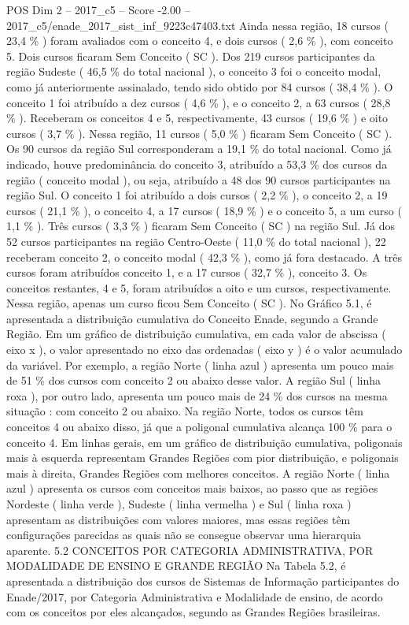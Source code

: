 \begin{textsample}{POS Dim 2 – 2017\_c5 – Score -2.00 – 2017\_c5/enade\_2017\_sist\_inf\_9223c47403.txt}
Ainda nessa região, 18 cursos ( 23,4 \% ) foram avaliados com o conceito 4, e dois cursos ( 2,6 \% ), com conceito 5.
Dois cursos ficaram Sem Conceito ( SC ).
Dos 219 cursos participantes da região Sudeste ( 46,5 \% do total nacional ), o conceito 3 foi o conceito modal, como já anteriormente assinalado, tendo sido obtido por 84 cursos ( 38,4 \% ).
O conceito 1 foi atribuído a dez cursos ( 4,6 \% ), e o conceito 2, a 63 cursos ( 28,8 \% ).
Receberam os conceitos 4 e 5, respectivamente, 43 cursos ( 19,6 \% ) e oito cursos ( 3,7 \% ).
Nessa região, 11 cursos ( 5,0 \% ) ficaram Sem Conceito ( SC ).
Os 90 cursos da região Sul corresponderam a 19,1 \% do total nacional.
Como já indicado, houve predominância do conceito 3, atribuído a 53,3 \% dos cursos da região ( conceito modal ), ou seja, atribuído a 48 dos 90 cursos participantes na região Sul.
O conceito 1 foi atribuído a dois cursos ( 2,2 \% ), o conceito 2, a 19 cursos ( 21,1 \% ), o conceito 4, a 17 cursos ( 18,9 \% ) e o conceito 5, a um curso ( 1,1 \% ).
Três cursos ( 3,3 \% ) ficaram Sem Conceito ( SC ) na região Sul.
Já dos 52 cursos participantes na região Centro-Oeste ( 11,0 \% do total nacional ), 22 receberam conceito 2, o conceito modal ( 42,3 \% ), como já fora destacado.
A três cursos foram atribuídos conceito 1, e a 17 cursos ( 32,7 \% ), conceito 3.
Os conceitos restantes, 4 e 5, foram atribuídos a oito e um cursos, respectivamente.
Nessa região, apenas um curso ficou Sem Conceito ( SC ).
No Gráfico 5.1, é apresentada a distribuição cumulativa do Conceito Enade, segundo a Grande Região.
Em um gráfico de distribuição cumulativa, em cada valor de abscissa ( eixo x ), o valor apresentado no eixo das ordenadas ( eixo y ) é o valor acumulado da variável.
Por exemplo, a região Norte ( linha azul ) apresenta um pouco mais de 51 \% dos cursos com conceito 2 ou abaixo desse valor.
A região Sul ( linha roxa ), por outro lado, apresenta um pouco mais de 24 \% dos cursos na mesma situação : com conceito 2 ou abaixo.
Na região Norte, todos os cursos têm conceitos 4 ou abaixo disso, já que a poligonal cumulativa alcança 100 \% para o conceito 4.
Em linhas gerais, em um gráfico de distribuição cumulativa, poligonais mais à esquerda representam Grandes Regiões com pior distribuição, e poligonais mais à direita, Grandes Regiões com melhores conceitos.
A região Norte ( linha azul ) apresenta os cursos com conceitos mais baixos, ao passo que as regiões Nordeste ( linha verde ), Sudeste ( linha vermelha ) e Sul ( linha roxa ) apresentam as distribuições com valores maiores, mas essas regiões têm configurações parecidas as quais não se consegue observar uma hierarquia aparente. 5.2 CONCEITOS POR CATEGORIA ADMINISTRATIVA, POR MODALIDADE DE ENSINO E GRANDE REGIÃO Na Tabela 5.2, é apresentada a distribuição dos cursos de Sistemas de Informação participantes do Enade/2017, por Categoria Administrativa e Modalidade de ensino, de acordo com os conceitos por eles alcançados, segundo as Grandes Regiões brasileiras.

\end{textsample}
